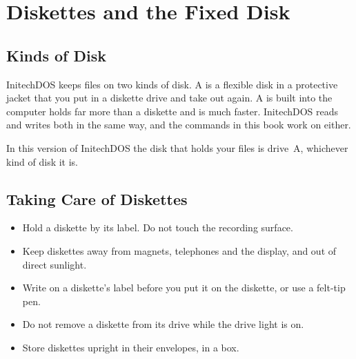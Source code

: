 \chapter{Diskettes and the Fixed Disk}

\section{Kinds of Disk}
InitechDOS keeps files on two kinds of disk.  A  is a
flexible disk in a protective jacket that you put in a diskette drive and
take out again.  A  is built into the computer holds
far more than a diskette and is much faster.  InitechDOS reads and writes
both in the same way, and the commands in this book work on either.

In this version of InitechDOS the disk that holds your files is drive~A,
whichever kind of disk it is.

\section{Taking Care of Diskettes}
\begin{itemize}
\item Hold a diskette by its label.  Do not touch the recording surface.
\item Keep diskettes away from magnets, telephones and the display, and
  out of direct sunlight.
\item Write on a diskette's label before you put it on the diskette, or
  use a felt-tip pen.
\item Do not remove a diskette from its drive while the drive light is on.
\item Store diskettes upright in their envelopes, in a box.
\end{itemize}

